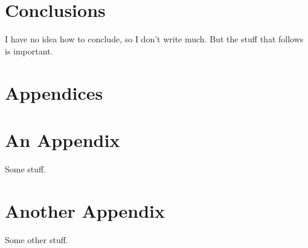\documentclass[11pt,twoside]{article}
\numberwithin{Theorem}{section}
\numberwithin{Definition}{section}
\numberwithin{Lemma}{section}
\numberwithin{Algorithm}{section}
\numberwithin{equation}{section}
\begin{document}
\section{Conclusions}
I have no idea how to conclude, so I don't write much. But the stuff that follows is important.
\clearpage


\clearpage

\appendix
\section*{Appendices}

\section{An Appendix}
\label{app:one}

Some stuff.
\clearpage

\section{Another Appendix}
\label{app:two}

Some other stuff.
\end{document}
